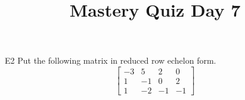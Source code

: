 \documentclass{sbgLAquiz}
\title{Mastery Quiz Day 7 }
\begin{document}
\begin{problem}{E2}
Put the following matrix in reduced row echelon form.
$$\begin{bmatrix}
-3 & 5 & 2 & 0 \\
 1 & -1 & 0 & 2 \\
 1 & -2 & -1 & -1
\end{bmatrix}$$
\end{problem}
\end{document}
